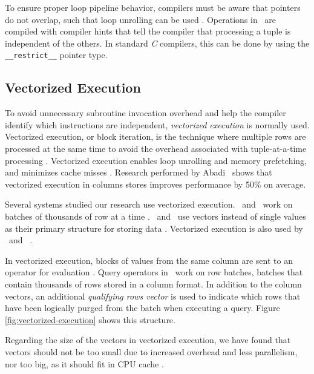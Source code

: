 To ensure proper loop pipeline behavior, compilers must be aware that pointers do not overlap, such that loop unrolling can be used \cite{Boncz2005-wj}. Operations in \monetx~are compiled with compiler hints that tell the compiler that processing a tuple is independent of the others. In standard \textit{C} compilers, this can be done by using the \texttt{\_\_restrict\_\_} pointer type.


\subsection{Vectorized Execution}
\label{sub:Vectorized Execution}
To avoid unnecessary subroutine invocation overhead and help the compiler identify which instructions are independent, \textit{vectorized execution} is normally used. Vectorized execution, or block iteration, is the technique where multiple rows are processed at the same time to avoid the overhead associated with tuple-at-a-time processing \cite{Abadi2008-dd}. Vectorized execution enables loop unrolling and memory prefetching, and minimizes cache misses \cite{Larson2013-mc}. Research performed by Abadi \ea~shows that vectorized execution in columns stores improves performance by 50\% on average.

Several systems studied our research use vectorized execution. \ibm~and \mssql~work on batches of thousands of row at a time \cite{Larson2013-mc, Raman2013-em}. \monetdb~and \monetx~use vectors instead of single values as their primary structure for storing data \cite{Boncz2005-wj, Boncz2002-yj}. Vectorized execution is also used by \cstore~and \blink~\cite{Johnson2008-cp, Stonebraker2005-qz}.

In vectorized execution, blocks of values from the same column are sent to an operator for evaluation \cite{Zukowski2006-oz}. Query operators in \mssql~work on row batches, batches that contain thousands of rows stored in a column format. In addition to the column vectors, an additional \textit{qualifying rows vector} is used to indicate which rows that have been logically purged from the batch when executing a query. Figure \ref{fig:vectorized-execution} shows this structure.

Regarding the size of the vectors in vectorized execution, we have found that vectors should not be too small due to increased overhead and less parallelism, nor too big, as it should fit in CPU cache \cite{Boncz2005-wj}.

